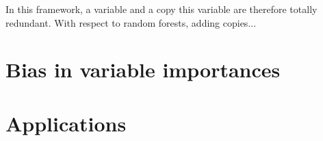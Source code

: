 In this framework, a variable and a copy this variable are therefore totally
redundant. With respect to random forests, adding copies...





\section{Bias in variable importances}
\label{sec:7:bias}




%


\section{Applications}
\label{sec:7:applications}

